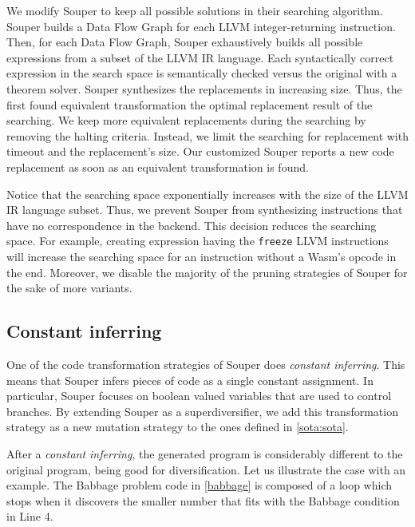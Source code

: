 We modify Souper to keep all possible solutions in their searching algorithm.
Souper builds a Data Flow Graph for each LLVM integer-returning instruction. 
Then, for each Data Flow Graph, Souper exhaustively builds all possible expressions from a subset of the LLVM IR language.
Each syntactically correct expression in the search space is semantically checked versus the original with a theorem solver. Souper synthesizes the replacements in increasing size. Thus, the first found equivalent transformation the optimal replacement result of the searching. 
We keep more equivalent replacements during the searching by removing the halting criteria. Instead, we limit the searching for replacement with timeout and the replacement's size. Our customized Souper reports a new code replacement as soon as an equivalent transformation is found.

Notice that the searching space exponentially increases with the size of the LLVM IR language subset. Thus,
we prevent Souper from synthesizing instructions that have no correspondence in the \wasm backend. This decision reduces the searching space. For example, creating expression having the  \texttt{freeze} LLVM instructions will increase the searching space for an instruction without a Wasm's opcode in the end.
Moreover, we disable the majority of the pruning strategies of Souper for the sake of more variants. 

\subsection{Constant inferring}
One of the code transformation strategies of Souper does \emph{constant inferring}. This means that Souper infers pieces of code as a single constant assignment. In particular, Souper focuses on boolean valued variables that are used to control branches.
By extending Souper as a superdiversifier, we add this transformation strategy as a new mutation strategy to the ones defined in \autoref{sota:sota}. 


After a \emph{constant inferring}, the generated program is considerably different to the original program, being good for diversification.
Let us illustrate the case with an example.
The Babbage problem code in \autoref{babbage} is composed of a loop which stops when it discovers the smaller number that fits with the Babbage condition in Line 4.


